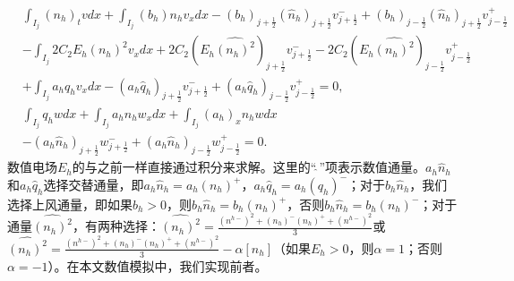 \begin{align}
	 & \int_{I_{j}} (n_h)_t v d x+\int_{I_{j}}\left(b_h\right) n_h v_{x} d x                                                                    -\left(b_h\right)_{j+\frac{1}{2}} (\hat{n}_h)_{j+\frac{1}{2}} v_{j+\frac{1}{2}}^{-}  +\left(b_h\right)_{j-\frac{1}{2}} (\hat{n}_h)_{j+\frac{1}{2}} v_{j-\frac{1}{2}}^{+}                                                                                                                                   \nonumber \\
	 & -\int_{I_{j}} 2 C_{2} E_h\left(n_h\right)^{2} v_{x} d x+2 C_{2}\left(E_h \widehat{\left(n_h\right)^{2}}\right)_{j+\frac{1}{2}} v_{j+\frac{1}{2}}^{-}-2 C_{2}\left(E_h \widehat{\left(n_h\right)^{2}}\right)_{j-\frac{1}{2}} v_{j-\frac{1}{2}}^{+} \nonumber                                                                                                                                                                                                   \\
	 & +\int_{I_{j}} a_h q_h v_{x} d x -\left(a_h \hat{q}_{h}\right)_{j+\frac{1}{2}} v_{j+\frac{1}{2}}^{-}+\left(a_h \hat{q}_{h}\right)_{j-\frac{1}{2}} v_{j-\frac{1}{2}}^{+}=0,             \label{eq:HFRewrittenLDGa}                                                                                                                                                                                                                                              \\
	 & \int_{I_{j}} q_h w d x+\int_{I_{j}} a_h n_h w_{x} d x+\int_{I_{j}}\left(a_h\right)_{x} n_h w d x                        \nonumber                                                                                                                                                                                                                                                                                                                             \\
	 & -\left(a_h \hat{n}_{h}\right)_{j+\frac{1}{2}} w_{j+\frac{1}{2}}^{-}+\left(a_h \hat{n}_{h}\right)_{j-\frac{1}{2}} w_{j-\frac{1}{2}}^{+}=0 .\label{eq:HFRewrittenLDGb}
\end{align}
数值电场$E_h$的与之前一样直接通过积分来求解。这里的“$\widehat{\ }$”项表示数值通量。$a_h \hat{n}_{h}$和$a_h \hat{q}_{h}$选择交替通量，即$a_h \hat{n}_{h}=a_h\left(n_h\right)^{+}$，$a_h \hat{q}_{h}=a_h\left(q_h\right)^{-}$；对于$b_h \hat{n}_{h}$，我们选择上风通量，即如果$b_h>0$，则$b_h \hat{n}_{h}=b_h\left(n_h\right)^{+}$，否则$b_h \hat{n}_{h}=b_h\left(n_h\right)^{-}$；对于通量$\widehat{\left(n_h\right)^{2}}$，有两种选择：$\widehat{\left(n_h\right)^{2}}=\frac{\left(n^{h-}\right)^{2}+\left(n_h\right)^{-}\left(n_h\right)^{+}+\left(n^{h-}\right)^{2}}{3}$或$\widehat{\left(n_h\right)^{2}}=\frac{\left(n^{h-}\right)^{2}+\left(n_h\right)^{-}\left(n_h\right)^{+}+\left(n^{h-}\right)^{2}}{3}-\alpha\left[n_h\right]$（如果$E_h>0$，则$\alpha=1$；否则$\alpha=-1$）。在本文数值模拟中，我们实现前者。
